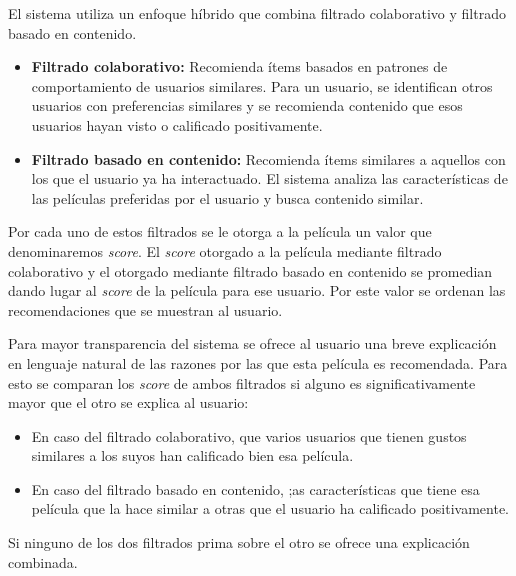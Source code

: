 \documentclass{llncs}
\begin{document}
	El sistema utiliza un enfoque híbrido que combina filtrado colaborativo y filtrado basado en contenido.
	\begin{itemize}
		\item \textbf{Filtrado colaborativo:} Recomienda ítems basados en patrones de comportamiento de usuarios similares. Para un usuario, se identifican otros usuarios con preferencias similares y se recomienda contenido que esos usuarios hayan visto o calificado positivamente.
		\item \textbf{Filtrado basado en contenido:} Recomienda ítems similares a aquellos con los que el usuario ya ha interactuado. El sistema analiza las características de las películas preferidas por el usuario y busca contenido similar.
	\end{itemize}
	Por cada uno de estos filtrados se le otorga a la película un valor que denominaremos \textit{score}. El \textit{score} otorgado a la película mediante filtrado colaborativo y el otorgado mediante filtrado basado en contenido se promedian dando lugar al \textit{score} de la película para ese usuario. Por este valor se ordenan las recomendaciones que se muestran al usuario.
	
	Para mayor transparencia del sistema se ofrece al usuario una breve explicación en lenguaje natural de las razones por las que esta película es recomendada. Para esto se comparan los \textit{score} de ambos filtrados si alguno es significativamente mayor que el otro se explica al usuario:
	\begin{itemize}
		\item En caso del filtrado colaborativo, que varios usuarios que tienen gustos similares a los suyos han calificado bien esa película.
		\item En caso del filtrado basado en contenido, ;as características que tiene esa película que la hace similar a otras que el usuario ha calificado positivamente.
	\end{itemize}
	Si ninguno de los dos filtrados prima sobre el otro se ofrece una explicación combinada.
	
\end{document}

